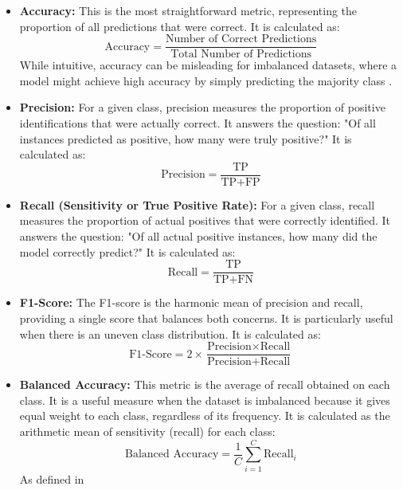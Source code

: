 \begin{itemize}
    \item \textbf{Accuracy:} This is the most straightforward metric, representing the proportion of all predictions that were correct. It is calculated as:
    \begin{equation}
        \text{Accuracy} = \frac{\text{Number of Correct Predictions}}{\text{Total Number of Predictions}}
    \end{equation}
     \cite{goodfellow2016deep,litjens2017survey}
    While intuitive, accuracy can be misleading for imbalanced datasets, where a model might achieve high accuracy by simply predicting the majority class \cite{goodfellow2016deep,litjens2017survey}.

    \item \textbf{Precision:} For a given class, precision measures the proportion of positive identifications that were actually correct. It answers the question: "Of all instances predicted as positive, how many were truly positive?" It is calculated as:
    \begin{equation}
        \text{Precision} = \frac{\text{TP}}{\text{TP} + \text{FP}}
    \end{equation}
     \cite{goodfellow2016deep,litjens2017survey}

    \item \textbf{Recall (Sensitivity or True Positive Rate):} For a given class, recall measures the proportion of actual positives that were correctly identified. It answers the question: "Of all actual positive instances, how many did the model correctly predict?" It is calculated as:
    \begin{equation}
        \text{Recall} = \frac{\text{TP}}{\text{TP} + \text{FN}}
    \end{equation}
    \cite{goodfellow2016deep,litjens2017survey}

    \item \textbf{F1-Score:} The F1-score is the harmonic mean of precision and recall, providing a single score that balances both concerns. It is particularly useful when there is an uneven class distribution. It is calculated as:
    \begin{equation}
        \text{F1-Score} = 2 \times \frac{\text{Precision} \times \text{Recall}}{\text{Precision} + \text{Recall}}
    \end{equation}
    \cite{goodfellow2016deep,litjens2017survey}

    \item \textbf{Balanced Accuracy:} This metric is the average of recall obtained on each class. It is a useful measure when the dataset is imbalanced because it gives equal weight to each class, regardless of its frequency. It is calculated as the arithmetic mean of sensitivity (recall) for each class:
    \begin{equation}
        \text{Balanced Accuracy} = \frac{1}{C} \sum_{i=1}^{C} \text{Recall}_i
    \end{equation}
    As defined in \cite{litjens2017survey}


\end{itemize}
